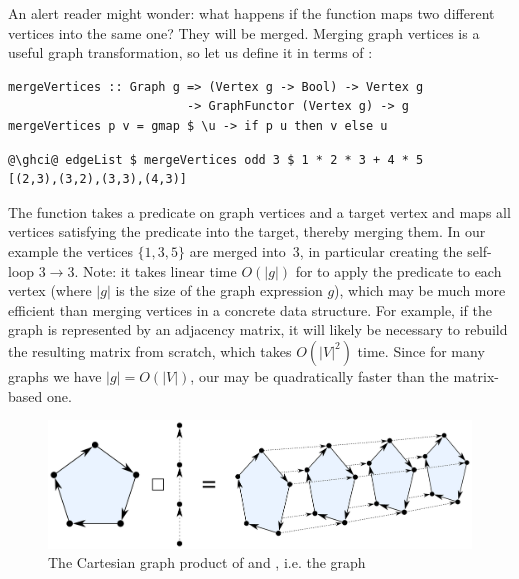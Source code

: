 An alert reader might wonder: what happens if the function maps two different
vertices into the same one? They will be merged. Merging graph vertices is
a useful graph transformation, so let us define it in terms of :

\begin{verbatim}
mergeVertices :: Graph g => (Vertex g -> Bool) -> Vertex g
                         -> GraphFunctor (Vertex g) -> g
mergeVertices p v = gmap $ \u -> if p u then v else u
\end{verbatim}
\vspace{-1mm}
\begin{verbatim}
@\ghci@ edgeList $ mergeVertices odd 3 $ 1 * 2 * 3 + 4 * 5
[(2,3),(3,2),(3,3),(4,3)]
\end{verbatim}
\vspace{-1mm}
The function takes a predicate on graph vertices and a target vertex and
maps all vertices satisfying the predicate into the target, thereby
merging them. In our example the  vertices $\{1, 3, 5\}$ are merged
into~3, in particular creating the self-loop $3 \rightarrow 3$. Note: it takes
linear time $O(|g|)$ for  to apply the predicate to each vertex
(where $|g|$ is the size of the graph expression $g$), which may be much more efficient
than merging vertices in a concrete data structure. For example, if the graph
is represented by an adjacency matrix, it will likely be necessary to rebuild
the resulting matrix from scratch, which takes $O(|V|^2)$ time. Since for
many graphs we have $|g| = O(|V|)$, our 
may be quadratically faster than the matrix-based one.

\begin{figure}
\centerline{\includegraphics[scale=0.36]{fig/graph-product.pdf}}
\vspace{-4mm}
\caption{The Cartesian graph product of  and , i.e. the graph
\label{fig-product}}
\vspace{-3mm}
\end{figure}

